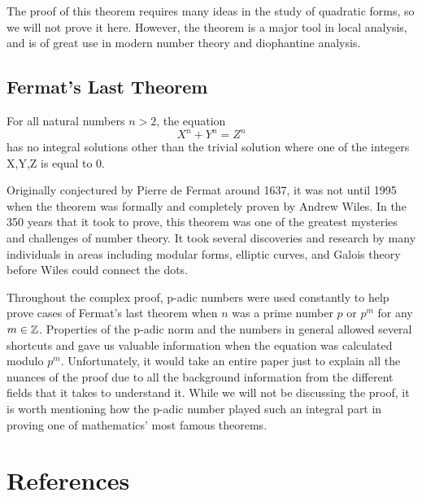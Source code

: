 \documentclass[a4paper]{article}
\begin{document}
The proof of this theorem requires many ideas in the study of 
quadratic forms,
so we will not prove it here.  However, the theorem is a major 
tool in local
analysis, and is of great use in modern number theory and 
diophantine analysis.

\subsection{Fermat's Last Theorem}

\begin{theorem}
For all natural numbers $n>2$, the equation
\[
	X^n+Y^n=Z^n
\]
has no integral solutions other than the trivial solution where one of
the integers X,Y,Z is equal to 0.
\end{theorem}

Originally conjectured by Pierre de Fermat around 1637, it was not until 
1995 when the theorem was formally and completely proven by Andrew Wiles. 
In the 350 years that it took to prove, this theorem was one of the
greatest mysteries and challenges of number theory.  It took several
discoveries and research by many individuals in areas including
modular forms, elliptic curves, and Galois theory before Wiles could
connect the dots.

Throughout the complex proof, p-adic numbers were used constantly to help
prove cases of Fermat's last theorem when $n$ was a prime number $p$ or
$p^m$ for any $m\in\mathbb Z$.  Properties of the p-adic norm and the numbers
in general allowed several shortcuts and gave us valuable information
when the equation was calculated modulo $p^m$.  Unfortunately, it would
take an entire paper just to explain all the nuances of the proof due to
all the background information from the different fields that it takes to
understand it.  While we will not be discussing the proof, it is worth
mentioning how the p-adic number played such an integral part in proving
one of mathematics' most famous theorems.

\section{References}
\end{document}
